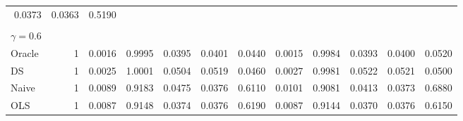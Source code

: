 \begin{tabular}{llllllllllll}
  \multicolumn{1}{r}{0.0373} &
  \multicolumn{1}{r}{0.0363} &
  \multicolumn{1}{r}{0.5190} \\
\multicolumn{1}{l}{} &
  \multicolumn{1}{|r}{} &
  \multicolumn{1}{r}{} &
  \multicolumn{1}{r}{} &
  \multicolumn{1}{r}{} &
  \multicolumn{1}{r}{} &
  \multicolumn{1}{r}{} &
  \multicolumn{1}{r}{} &
  \multicolumn{1}{r}{} &
  \multicolumn{1}{r}{} &
  \multicolumn{1}{r}{} &
  \multicolumn{1}{r}{} \\
\multicolumn{1}{l}{$\gamma = 0.6$} &
  \multicolumn{1}{|r}{} &
  \multicolumn{1}{r}{} &
  \multicolumn{1}{r}{} &
  \multicolumn{1}{r}{} &
  \multicolumn{1}{r}{} &
  \multicolumn{1}{r}{} &
  \multicolumn{1}{r}{} &
  \multicolumn{1}{r}{} &
  \multicolumn{1}{r}{} &
  \multicolumn{1}{r}{} &
  \multicolumn{1}{r}{} \\
\multicolumn{1}{l}{\hspace{1em}Oracle} &
  \multicolumn{1}{|r}{1} &
  \multicolumn{1}{r}{0.0016} &
  \multicolumn{1}{r}{0.9995} &
  \multicolumn{1}{r}{0.0395} &
  \multicolumn{1}{r}{0.0401} &
  \multicolumn{1}{r}{0.0440} &
  \multicolumn{1}{r}{0.0015} &
  \multicolumn{1}{r}{0.9984} &
  \multicolumn{1}{r}{0.0393} &
  \multicolumn{1}{r}{0.0400} &
  \multicolumn{1}{r}{0.0520} \\
\multicolumn{1}{l}{\hspace{1em}DS} &
  \multicolumn{1}{|r}{1} &
  \multicolumn{1}{r}{0.0025} &
  \multicolumn{1}{r}{1.0001} &
  \multicolumn{1}{r}{0.0504} &
  \multicolumn{1}{r}{0.0519} &
  \multicolumn{1}{r}{0.0460} &
  \multicolumn{1}{r}{0.0027} &
  \multicolumn{1}{r}{0.9981} &
  \multicolumn{1}{r}{0.0522} &
  \multicolumn{1}{r}{0.0521} &
  \multicolumn{1}{r}{0.0500} \\
\multicolumn{1}{l}{\hspace{1em}Naive} &
  \multicolumn{1}{|r}{1} &
  \multicolumn{1}{r}{0.0089} &
  \multicolumn{1}{r}{0.9183} &
  \multicolumn{1}{r}{0.0475} &
  \multicolumn{1}{r}{0.0376} &
  \multicolumn{1}{r}{0.6110} &
  \multicolumn{1}{r}{0.0101} &
  \multicolumn{1}{r}{0.9081} &
  \multicolumn{1}{r}{0.0413} &
  \multicolumn{1}{r}{0.0373} &
  \multicolumn{1}{r}{0.6880} \\
\multicolumn{1}{l}{\hspace{1em}OLS} &
  \multicolumn{1}{|r}{1} &
  \multicolumn{1}{r}{0.0087} &
  \multicolumn{1}{r}{0.9148} &
  \multicolumn{1}{r}{0.0374} &
  \multicolumn{1}{r}{0.0376} &
  \multicolumn{1}{r}{0.6190} &
  \multicolumn{1}{r}{0.0087} &
  \multicolumn{1}{r}{0.9144} &
  \multicolumn{1}{r}{0.0370} &
  \multicolumn{1}{r}{0.0376} &
  \multicolumn{1}{r}{0.6150} \\

\end{tabular}
